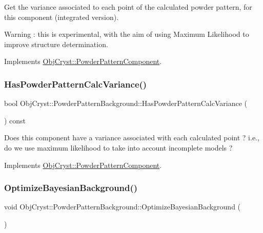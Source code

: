 Get the variance associated to each point of the calculated powder pattern, for this component (integrated version).

\begin{DoxyWarning}{Warning}
\+: this is experimental, with the aim of using Maximum Likelihood to improve structure determination. 
\end{DoxyWarning}


Implements \mbox{\hyperlink{class_obj_cryst_1_1_powder_pattern_component_ae721bd290b50aa9503bac419616a21c6}{Obj\+Cryst\+::\+Powder\+Pattern\+Component}}.

\mbox{\label{class_obj_cryst_1_1_powder_pattern_background_a126f036fe66797c52c7e362663925ad9}} 
\subsubsection{\texorpdfstring{HasPowderPatternCalcVariance()}{HasPowderPatternCalcVariance()}}
{\footnotesize\ttfamily bool Obj\+Cryst\+::\+Powder\+Pattern\+Background\+::\+Has\+Powder\+Pattern\+Calc\+Variance (\begin{DoxyParamCaption}{ }\end{DoxyParamCaption}) const\hspace{0.3cm}{\ttfamily [virtual]}}

Does this component have a variance associated with each calculated point ? i.\+e., do we use maximum likelihood to take into account incomplete models ? 

Implements \mbox{\hyperlink{class_obj_cryst_1_1_powder_pattern_component_a773d077df9d066f3d15631ec84ca15fd}{Obj\+Cryst\+::\+Powder\+Pattern\+Component}}.

\mbox{\label{class_obj_cryst_1_1_powder_pattern_background_a0735ae2350ebce9320ebc2fd16dd94be}} 
\subsubsection{\texorpdfstring{OptimizeBayesianBackground()}{OptimizeBayesianBackground()}}
{\footnotesize\ttfamily void Obj\+Cryst\+::\+Powder\+Pattern\+Background\+::\+Optimize\+Bayesian\+Background (\begin{DoxyParamCaption}{ }\end{DoxyParamCaption})}

